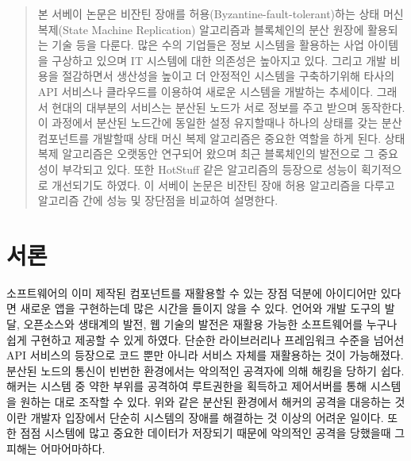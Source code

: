 
\date{Received: date / Accepted: date}


\maketitle

\renewcommand{\abstractname}{초록}
\begin{abstract}
본 서베이 논문은 비잔틴 장애를 허용(Byzantine-fault-tolerant)하는 
상태 머신 복제(State Machine Replication) 알고리즘과 블록체인의 분산 원장에 활용되는 기술 등을 다룬다. 
많은 수의 기업들은 정보 시스템을 활용하는 사업 아이템을 구상하고 있으며
IT 시스템에 대한 의존성은 높아지고 있다.
그리고 개발 비용을 절감하면서 생산성을 높이고 더 안정적인 시스템을 구축하기위해
타사의 API 서비스나 클라우드를 이용하여 새로운 시스템을 개발하는 추세이다.
그래서 현대의 대부분의 서비스는 분산된 노드가 서로 정보를 주고 받으며 동작한다.
이 과정에서 분산된 노드간에 동일한 설정 유지할때나 하나의 상태를 갖는 분산 컴포넌트를 개발할때
상태 머신 복제 알고리즘은 중요한 역할을 하게 된다.
상태 복제 알고리즘은 오랫동안 연구되어 왔으며 최근 블록체인의
발전으로 그 중요성이 부각되고 있다. 또한 HotStuff 같은 알고리즘의 등장으로 성능이 획기적으로
개선되기도 하였다. 이 서베이 논문은 비잔틴 장애 허용 알고리즘을 다루고
알고리즘 간에 성능 및 장단점을 비교하여 설명한다.

\end{abstract}

\section{서론}
\label{intro}
소프트웨어의 이미 제작된 컴포넌트를 재활용할 수 있는 장점 덕분에 
아이디어만 있다면 새로운 앱을 구현하는데 많은 시간을 들이지 않을 수 있다.
언어와 개발 도구의 발달, 오픈소스와 생태계의 발전, 웹 기술의 발전은 
재활용 가능한 소프트웨어를 누구나 쉽게 구현하고 제공할 수 있게 하였다.
단순한 라이브러리나 프레임워크 수준을 넘어선 API 서비스의 등장으로
코드 뿐만 아니라 서비스 자체를 재활용하는 것이 가능해졌다. 분산된 노드의
통신이 빈번한 환경에서는 악의적인 공격자에 의해 해킹을 당하기 쉽다.
해커는 시스템 중 약한 부위를 공격하여 루트권한을 획득하고 제어서버를 통해 
시스템을 원하는 대로 조작할 수 있다. 위와 같은 분산된 환경에서 해커의 공격을
대응하는 것이란 개발자 입장에서 단순히 시스템의 장애를 해결하는 것
이상의 어려운 일이다. 또한 점점 시스템에 많고 중요한 데이터가 저장되기 때문에 악의적인 공격을
당했을때 그 피해는 어마어마하다. 


